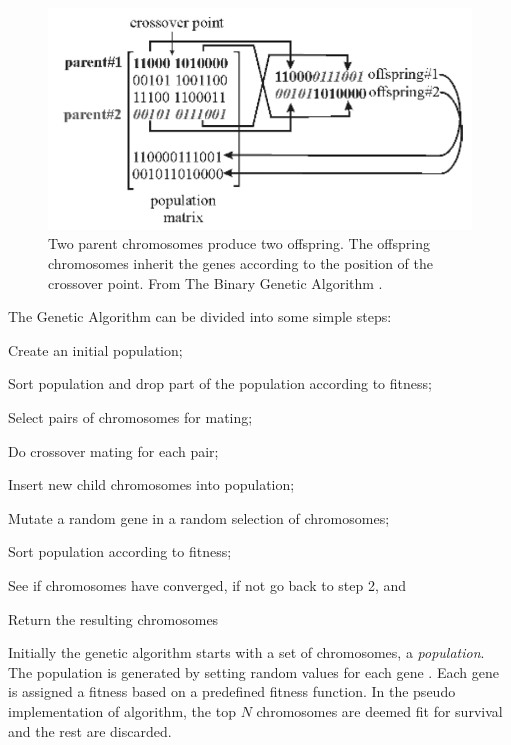 \begin{figure}[!h]
  \begin{center}
    \includegraphics[totalheight=0.175\textheight]{figures/crossover}
  \end{center}
  \caption{Two parent chromosomes produce two offspring. The offspring chromosomes inherit the genes according to the position of the crossover point. From The Binary Genetic Algorithm \protect \cite[p. 42]{Haupt2004a}.}
  \label{fig:crossover}
\end{figure}

The Genetic Algorithm can be divided into some simple steps:
\begin{inparaenum}[\itshape 1\upshape)]
\item Create an initial population;
\item Sort population and drop part of the population according to fitness;
\item Select pairs of chromosomes for mating;
\item Do crossover mating for each pair;
\item Insert new child chromosomes into population;
\item Mutate a random gene in a random selection of chromosomes;
\item Sort population according to fitness;
\item See if chromosomes have converged, if not go back to step 2, and
\item Return the resulting chromosomes
\end{inparaenum}

Initially the genetic algorithm starts with a set of chromosomes, a \textit{population}. The population is generated by setting random values for each gene \cite{Haupt2004a,Negnevitsky2002,Goldberg1989}. Each gene is assigned a fitness based on a predefined fitness function. In the pseudo implementation of \citeauthor{Haupt2004a} algorithm, the top \(N\) chromosomes are deemed fit for survival and the rest are discarded.


